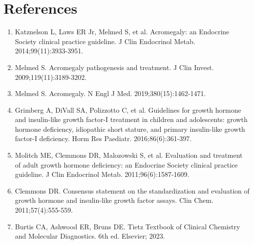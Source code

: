\section*{References}
\begin{enumerate}
  \item Katznelson L, Laws ER Jr, Melmed S, et al. Acromegaly: an Endocrine Society clinical practice guideline. J Clin Endocrinol Metab. 2014;99(11):3933-3951.
  \item Melmed S. Acromegaly pathogenesis and treatment. J Clin Invest. 2009;119(11):3189-3202.
  \item Melmed S. Acromegaly. N Engl J Med. 2019;380(15):1462-1471.
  \item Grimberg A, DiVall SA, Polizzotto C, et al. Guidelines for growth hormone and insulin-like growth factor-I treatment in children and adolescents: growth hormone deficiency, idiopathic short stature, and primary insulin-like growth factor-I deficiency. Horm Res Paediatr. 2016;86(6):361-397.
  \item Molitch ME, Clemmons DR, Malozowski S, et al. Evaluation and treatment of adult growth hormone deficiency: an Endocrine Society clinical practice guideline. J Clin Endocrinol Metab. 2011;96(6):1587-1609.
  \item Clemmons DR. Consensus statement on the standardization and evaluation of growth hormone and insulin-like growth factor assays. Clin Chem. 2011;57(4):555-559.
  \item Burtis CA, Ashwood ER, Bruns DE. Tietz Textbook of Clinical Chemistry and Molecular Diagnostics. 6th ed. Elsevier; 2023.
\end{enumerate}

\clearpage
